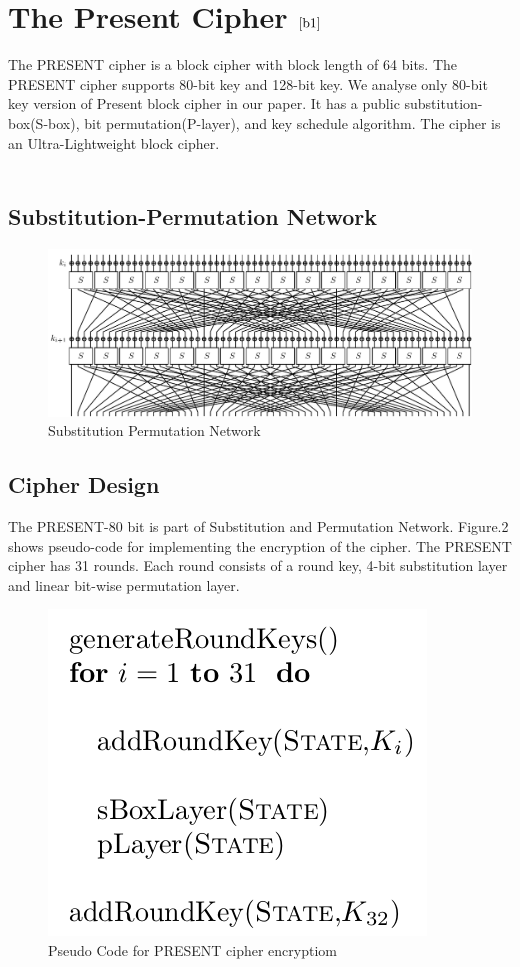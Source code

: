 \documentclass[journal=tosc,preprint]{iacrtrans}
\begin{document}
\section{The Present Cipher $\cite{b1}$}
The PRESENT cipher is a block cipher with block length of 64 bits. The PRESENT cipher supports 80-bit key and 128-bit key. We analyse only 80-bit key version of Present block cipher in our paper. It has a public substitution-box(S-box), bit permutation(P-layer), and key schedule algorithm. The cipher is an Ultra-Lightweight block cipher.\\\\
\subsection{Substitution-Permutation Network}
\begin{figure}[H]
	\centering
	\includegraphics[width=\linewidth]{PRESENT_diagram.pdf}
	\caption{Substitution Permutation Network}
\end{figure}
\subsection{Cipher Design}
The PRESENT-80 bit is part of Substitution and Permutation Network. Figure.2 shows pseudo-code for implementing the encryption of the cipher. The PRESENT cipher has 31 rounds.  Each round consists of a round key, 4-bit substitution layer and linear bit-wise
permutation layer. 
\begin{figure}[h!]
	\centering
	\includegraphics[width=0.34\linewidth, height=0.15\textheight]{"Screenshot from 2021-11-06 08-28-01"}
	\caption{Pseudo Code for PRESENT cipher encryptiom}
	\label{fig:screenshot-from-2021-11-06-08-28-01}
\end{figure}\\
\end{document}
